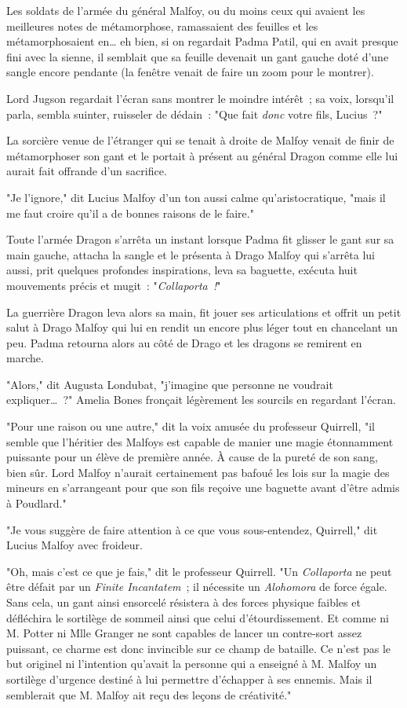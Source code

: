 Les soldats de l'armée du général Malfoy, ou du moins ceux qui avaient les meilleures notes de métamorphose, ramassaient des feuilles et les métamorphosaient en… eh bien, si on regardait Padma Patil, qui en avait presque fini avec la sienne, il semblait que sa feuille devenait un gant gauche doté d'une sangle encore pendante (la fenêtre venait de faire un zoom pour le montrer).

Lord Jugson regardait l'écran sans montrer le moindre intérêt~; sa voix, lorsqu'il parla, sembla suinter, ruisseler de dédain~: "Que fait \emph{donc} votre fils, Lucius~?"

La sorcière venue de l'étranger qui se tenait à droite de Malfoy venait de finir de métamorphoser son gant et le portait à présent au général Dragon comme elle lui aurait fait offrande d'un sacrifice.

"Je l'ignore," dit Lucius Malfoy d'un ton aussi calme qu'aristocratique, "mais il me faut croire qu'il a de bonnes raisons de le faire."

Toute l'armée Dragon s'arrêta un instant lorsque Padma fit glisser le gant sur sa main gauche, attacha la sangle et le présenta à Drago Malfoy qui s'arrêta lui aussi, prit quelques profondes inspirations, leva sa baguette, exécuta huit mouvements précis et mugit~: "\emph{Collaporta~!}"

La guerrière Dragon leva alors sa main, fit jouer ses articulations et offrit un petit salut à Drago Malfoy qui lui en rendit un encore plus léger tout en chancelant un peu. Padma retourna alors au côté de Drago et les dragons se remirent en marche.

"Alors," dit Augusta Londubat, "j'imagine que personne ne voudrait expliquer…~?" Amelia Bones fronçait légèrement les sourcils en regardant l'écran.

"Pour une raison ou une autre," dit la voix amusée du professeur Quirrell, "il semble que l'héritier des Malfoys est capable de manier une magie étonnamment puissante pour un élève de première année. À cause de la pureté de son sang, bien sûr. Lord Malfoy n'aurait certainement pas bafoué les lois sur la magie des mineurs en s'arrangeant pour que son fils reçoive une baguette avant d'être admis à Poudlard."

"Je vous suggère de faire attention à ce que vous sous-entendez, Quirrell," dit Lucius Malfoy avec froideur.

"Oh, mais c'est ce que je fais," dit le professeur Quirrell. "Un \emph{Collaporta} ne peut être défait par un \emph{Finite Incantatem}~; il nécessite un \emph{Alohomora} de force égale. Sans cela, un gant ainsi ensorcelé résistera à des forces physique faibles et défléchira le sortilège de sommeil ainsi que celui d'étourdissement. Et comme ni M. Potter ni Mlle Granger ne sont capables de lancer un contre-sort assez puissant, ce charme est donc invincible sur ce champ de bataille. Ce n'est pas le but originel ni l'intention qu'avait la personne qui a enseigné à M. Malfoy un sortilège d'urgence destiné à lui permettre d'échapper à ses ennemis. Mais il semblerait que M. Malfoy ait reçu des leçons de créativité."

